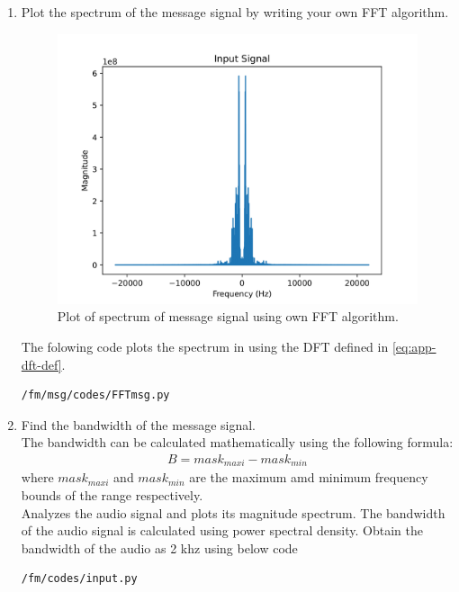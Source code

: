 \begin{enumerate}[label=\arabic*.,ref=\thesection.\theenumi]
\item Plot the spectrum of the message signal by writing your own FFT algorithm.\\
	\solution
\begin{figure}[H]
\centering
\includegraphics[width=\columnwidth]{fm/msg/figs/FFTown/input2.png}
\caption{Plot of spectrum of message signal using own FFT algorithm.}
\label{fig:FFTo}
\end{figure}
The folowing code plots the spectrum in  using the DFT defined in  \eqref{eq:app-dft-def}.
\begin{lstlisting}
/fm/msg/codes/FFTmsg.py
\end{lstlisting}

\item Find the bandwidth of the message signal.\\
\solution The bandwidth can be calculated mathematically using the following formula:
\begin{align*}
B=mask_{maxi}-mask_{min}
\end{align*}
where $mask_{maxi}$ and $mask_{min} $ are the maximum amd minimum frequency bounds of the range  respectively.\\
Analyzes the audio signal and plots its magnitude spectrum. The bandwidth of the audio signal is  calculated using power spectral density. Obtain the bandwidth of the audio as 2 khz using below code
\begin{lstlisting}
/fm/codes/input.py
\end{lstlisting}
\end{enumerate}
